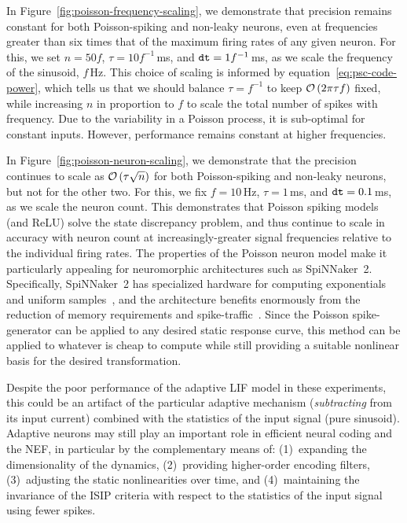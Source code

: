 In Figure~\ref{fig:poisson-frequency-scaling}, we demonstrate that precision remains constant for both Poisson-spiking and non-leaky neurons, even at frequencies greater than six times that of the maximum firing rates of any given neuron.
For this, we set $n = 50 f$, $\tau = 10 f^{-1}$\,ms, and $\texttt{dt}{} = 1 f^{-1}$\,ms, as we scale the frequency of the sinusoid, $f$\,Hz.
This choice of scaling is informed by equation~\ref{eq:psc-code-power}, which tells us that we should balance $\tau = f^{-1}$ to keep $\mathcal{O}\left({2 \pi \tau f }\right)$ fixed, while increasing $n$ in proportion to $f$ to scale the total number of spikes with frequency.
Due to the variability in a Poisson process, it is sub-optimal for constant inputs.
However, performance remains constant at higher frequencies.

In Figure~\ref{fig:poisson-neuron-scaling}, we demonstrate that the precision continues to scale as $\mathcal{O}\left({\tau \sqrt{n}}\right)$ for both Poisson-spiking and non-leaky neurons, but not for the other two.
For this, we fix $f = 10$\,Hz, $\tau = 1$\,ms, and $\texttt{dt}{} = 0.1$\,ms, as we scale the neuron count.
This demonstrates that Poisson spiking models (and ReLU) solve the state discrepancy problem, and thus continue to scale in accuracy with neuron count at increasingly-greater signal frequencies relative to the individual firing rates.
The properties of the Poisson neuron model make it particularly appealing for neuromorphic architectures such as SpiNNaker~2.
Specifically, SpiNNaker~2 has specialized hardware for computing exponentials~\citep{partzsch2017fixed} and uniform samples~\citep{liu2018memory}, and the architecture benefits enormously from the reduction of memory requirements and spike-traffic~\citep{stromatias2013power, mundy2015}.
Since the Poisson spike-generator can be applied to any desired static response curve, this method can be applied to whatever is cheap to compute while still providing a suitable nonlinear basis for the desired transformation.

Despite the poor performance of the adaptive LIF model in these experiments, this could be an artifact of the particular adaptive mechanism (\emph{subtracting} from its input current) combined with the statistics of the input signal (pure sinusoid).
Adaptive neurons may still play an important role in efficient neural coding and the NEF, in particular by the complementary means of: (1)~expanding the dimensionality of the dynamics, (2)~providing higher-order encoding filters, (3)~adjusting the static nonlinearities over time, and (4)~maintaining the invariance of the ISIP criteria with respect to the statistics of the input signal using fewer spikes.
